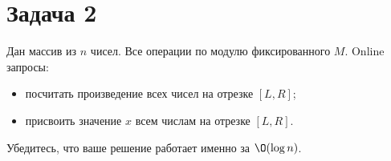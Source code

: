 \section{Задача 2}
Дан массив из $n$ чисел. Все операции по модулю фиксированного $M$.
Online запросы:
\begin{itemize}
    \item посчитать произведение всех чисел на отрезке $[L, R]$;
    \item присвоить значение $x$ всем числам на отрезке $[L, R]$.
\end{itemize}

Убедитесь, что ваше решение работает именно за $\O(\log n)$.
